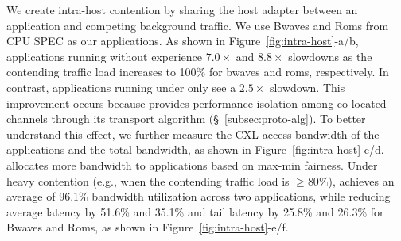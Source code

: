 We create intra-host contention by sharing the host adapter between an application and competing background traffic. 
We use Bwaves and Roms from CPU SPEC as our applications. As shown in Figure~\ref{fig:intra-host}-a/b, applications running without \sys experience $7.0\times$ and $8.8\times$ slowdowns as the contending traffic load increases to 100\% for bwaves and roms, respectively. In contrast, applications running under \sys only see a $2.5\times$ slowdown. This improvement occurs because \sys provides performance isolation among co-located channels through its transport algorithm (\S~\ref{subsec:proto-alg}). To better understand this effect, we further measure the CXL access bandwidth of the applications and the total bandwidth, as shown in Figure~\ref{fig:intra-host}-c/d. \sys allocates more bandwidth to applications based on max-min fairness. Under heavy contention (e.g., when the contending traffic load is $\geq 80\%$), \sys achieves an average of 96.1\% bandwidth utilization across two applications, while reducing average latency by 51.6\% and 35.1\% and tail latency by 25.8\% and 26.3\% for Bwaves and Roms, as shown in Figure~\ref{fig:intra-host}-e/f.




